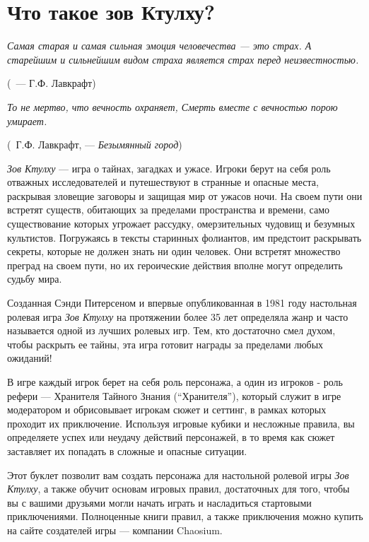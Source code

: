 \documentclass[letterpaper,twocolumn,openany, twoside, 11pt, usenames]{cocbook}
\renewenvironment{quote}{%
   \list{}{%
     \leftmargin0.0cm   %
     \rightmargin\leftmargin
   }
   \item\relax
}
{\endlist}
\let\oldquote\quote
\let\endoldquote\endquote
\renewenvironment{quote}[2][]
  {\if\relax\detokenize{#1}\relax
     \def\quoteauthor{~#2}%
   \fi
   \oldquote}
  {\par\nobreak\smallskip\hfill(\quoteauthor)%
   \endoldquote\addvspace{\bigskipamount}}
\begin{document}
\scriptsize

\section*{\nohyphens{Что такое зов Ктулху?}}
\begin{quote}{--- Г.Ф. Лавкрафт}
{\it Самая старая и самая сильная эмоция человечества --- это страх. А старейшим и сильнейшим видом страха является страх перед неизвестностью.}
\end{quote}

\begin{quote}{Г.Ф. Лавкрафт, --- {\it Безымянный город}}
{\it То не мертво, что вечность охраняет, Смерть вместе с вечностью порою умирает.}
\end{quote}

{\it Зов Ктулху} --- игра о тайнах, загадках и ужасе. Игроки берут на себя роль отважных исследователей и путешествуют в странные и опасные места, раскрывая зловещие заговоры и защищая мир от ужасов ночи. На своем пути они встретят существ, обитающих за пределами пространства и времени, само существование которых угрожает рассудку, омерзительных чудовищ и безумных культистов. Погружаясь в тексты старинных фолиантов, им предстоит раскрывать секреты, которые не должен знать ни один человек. Они встретят множество преград на своем пути, но их героические действия вполне могут определить судьбу мира.

Созданная Сэнди Питерсеном и впервые опубликованная в 1981 году настольная ролевая игра {\it Зов Ктулху} на протяжении более 35 лет определяла жанр и часто называется одной из лучших ролевых игр. Тем, кто достаточно смел духом, чтобы раскрыть ее тайны, эта игра готовит награды за пределами любых ожиданий!

В игре каждый игрок берет на себя роль персонажа, а один из игроков - роль рефери --- Хранителя Тайного Знания (``Хранителя''), который служит в игре модератором и обрисовывает игрокам сюжет и сеттинг, в рамках которых проходит их приключение. Используя игровые кубики и несложные правила, вы определяете успех или неудачу действий персонажей, в то время как сюжет заставляет их попадать в сложные и опасные ситуации.

Этот буклет позволит вам создать персонажа для настольной ролевой игры {\it Зов Ктулху}, а также обучит основам игровых правил, достаточных для того, чтобы вы с вашими друзьями могли начать играть и насладиться стартовыми приключениями. Полноценные книги правил, а также приключения можно купить на сайте создателей игры --- компании Chaosium.
\end{document}
